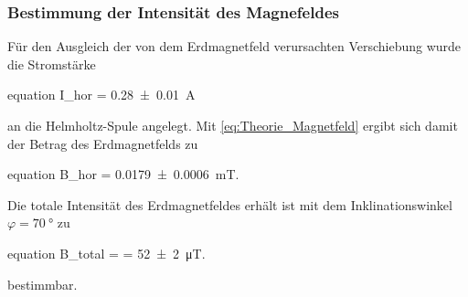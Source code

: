 	\subsubsection{Bestimmung der Intensität des Magnefeldes}
	
		Für den Ausgleich der von dem Erdmagnetfeld verursachten Verschiebung wurde die Stromstärke
 		\begin{empheq}{equation}
 			I_{hor} = \SI{0.28(1)}{\ampere}
 		\end{empheq}
		an die Helmholtz-Spule angelegt. Mit \cref{eq:Theorie_Magnetfeld} 
		ergibt sich damit der Betrag des Erdmagnetfelds zu 
 		\begin{empheq}{equation}
 			B_{hor} = \SI{0.0179(6)}{\milli\tesla}.
 		\end{empheq}
 		
 		Die totale Intensität des Erdmagnetfeldes erhält ist mit dem Inklinationswinkel 
 		$\varphi = \SI{70}{\degree}$ zu
 		\begin{empheq}{equation}
 			\label{eq:Auswertung_Btotal}
 			B_{total} =  = \SI{52(2)}{\micro\tesla}.
 		\end{empheq}
 		bestimmbar.
